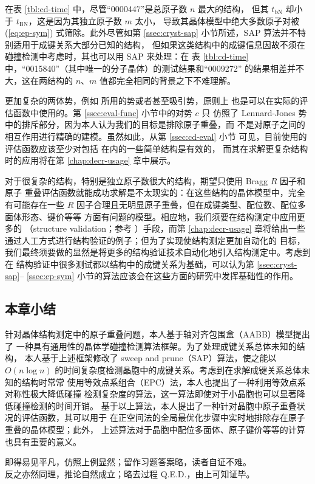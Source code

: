 在表 \ref{tbl:cd-time} 中，尽管“0000447”是总原子数 $n$ 最大的结构，
但其 $t_\text{bN}$ 却小于 $t_\text{BN}$，这是因为其独立原子数 $m$ 太小，
导致其晶体模型中绝大多数原子对被 (\ref{eq:ep-sym}) 式筛除。此外尽管如第
\ref{ssec:cryst-sap} 小节所述，SAP 算法并不特别适用于成键关系大部分已知的结构，
但如果这类结构中的成键信息因故不须在碰撞检测中考虑时，其也可以用 SAP 来处理：在
表 \ref{tbl:cd-time} 中，“0015840”（其中唯一的分子晶体）的测试结果和“0009272”
的结果相差并不大，这在两结构的 $n$、$m$ 值都完全相同的背景之下不难理解。

更加复杂的两体势，例如 \textcite{bushmarinov2012}所用的势或者甚至吸引势，原则上
也是可以在实际的评估函数中使用的。第 \ref{ssec:eval-func} 小节中的对势 $c$ 只
仿照了 Lennard-Jones 势中的排斥部分，因为本人认为我们的目标是排除原子重叠，而
不是对原子之间的相互作用进行精确的建模。虽然如此，从第 \ref{ssec:cd-eval} 小节
可见，目前使用的评估函数应该至少对包括  在内的一些简单结构是有效的，
而其在求解更复杂结构时的应用将在第 \ref{chap:decr-usage} 章中展示。

对于很复杂的结构，特别是独立原子数很大的结构，期望只使用 Bragg $R$ 因子和原子
重叠评估函数就能成功求解是不太现实的：在这些结构的晶体模型中，完全有可能存在一些
$R$ 因子合理且无明显原子重叠，但在成键类型、配位数、配位多面体形态、键价等等
方面有问题的模型。相应地，我们须要在结构测定中应用更多的%
（structure validation；参考 \cite{spek2003}）手段，而第 \ref{chap:decr-usage}
章将给出一些通过人工方式进行结构验证的例子；但为了实现使结构测定更加自动化的
目标，我们最终须要做的显然是将更多的结构验证技术自动化地引入结构测定中。考虑到在
结构验证中很多测试都以结构中的成键关系为基础，可以认为第 \ref{ssec:cryst-sap}--%
\ref{ssec:ep-sym} 小节的算法应该会在这些方面的研究中发挥基础性的作用。

\subsection{本章小结}

针对晶体结构测定中的原子重叠问题，本人基于轴对齐包围盒（AABB）模型提出了
一种具有通用性的晶体学碰撞检测算法框架。为了处理成键关系总体未知的结构，
本人基于上述框架修改了 sweep and prune（SAP）算法，使之能以 $O(n\log n)$
的时间复杂度检测晶胞中的成键关系。考虑到在求解成键关系总体未知的结构时常常
使用等效点系组合（EPC）法，本人也提出了一种利用等效点系对称性极大降低碰撞
检测复杂度的算法，这一算法即使对于小晶胞也可以显著降低碰撞检测的时间开销。
基于以上算法，本人提出了一种针对晶胞中原子重叠状况的评估函数，其可以用于
在正空间法的全局最优化步骤中实时地排除存在原子重叠的晶体模型；此外，
上述算法对于晶胞中配位多面体、原子键价等等的计算也具有重要的意义。

\begin{rquote}{}
	即得易见平凡，仿照上例显然；留作习题答案略，读者自证不难。\\
	反之亦然同理，推论自然成立；略去过程 Q.E.D.，由上可知证毕。
\end{rquote}


